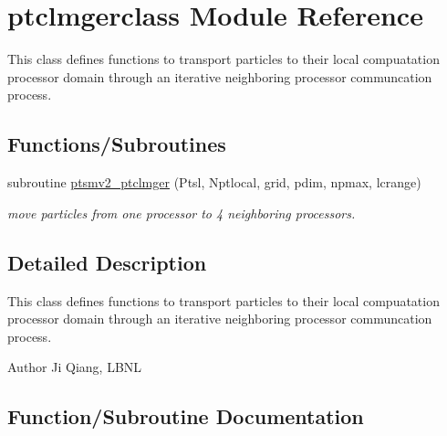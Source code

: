 \hypertarget{namespaceptclmgerclass}{}\section{ptclmgerclass Module Reference}
\label{namespaceptclmgerclass}


This class defines functions to transport particles to their local compuatation processor domain through an iterative neighboring processor communcation process.  


\subsection*{Functions/\+Subroutines}
\begin{DoxyCompactItemize}
\item 
subroutine \mbox{\hyperlink{namespaceptclmgerclass_a15bfd87febad22b6f820896f8720a3d7}{ptsmv2\+\_\+ptclmger}} (Ptsl, Nptlocal, grid, pdim, npmax, lcrange)
\begin{DoxyCompactList}\small\item\em move particles from one processor to 4 neighboring processors. \end{DoxyCompactList}\end{DoxyCompactItemize}


\subsection{Detailed Description}
This class defines functions to transport particles to their local compuatation processor domain through an iterative neighboring processor communcation process. 

\begin{DoxyAuthor}{Author}
Ji Qiang, L\+B\+NL 
\end{DoxyAuthor}


\subsection{Function/\+Subroutine Documentation}
\mbox{\label{namespaceptclmgerclass_a15bfd87febad22b6f820896f8720a3d7}} 
